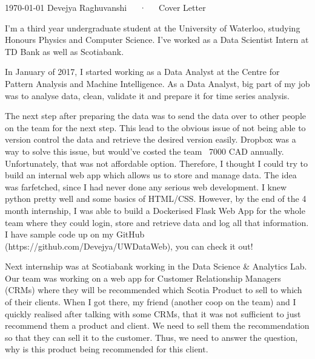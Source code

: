 \documentclass[11pt, a4paper]{awesome-cv}
\begin{document}
\makecvheader[R]

\makecvfooter
  {\today}
  {Devejya Raghuvanshi~~~·~~~Cover Letter}
  {}

\makelettertitle

\begin{cvletter}

I'm a third year undergraduate student at the University of Waterloo, studying Honours Physics and Computer Science. I've worked as a Data Scientist Intern at TD Bank as well as Scotiabank.

In January of 2017, I started working as a Data Analyst at the Centre for Pattern Analysis and Machine Intelligence. As a Data Analyst, big part of my job was to analyse data, clean, validate it and prepare it for time series analysis.

The next step after preparing the data was to send the data over to other people on the team for the next step. This lead to the obvious issue of not being able to version control the data and retrieve the desired version easily. Dropbox was a way to solve this issue, but would've costed the team ~7000 CAD annually. Unfortunately, that was not affordable option. Therefore, I thought I could try to build an internal web app which allows us to store and manage data. The idea was farfetched, since I had never done any serious web development. I knew python pretty well and some basics of HTML/CSS. However, by the end of the 4 month internship, I was able to build a Dockerised Flask Web App for the whole team where they could login, store and retrieve data and log all that information. I have sample code up on my GitHub (https://github.com/Devejya/UWDataWeb), you can check it out! 

Next internship was at Scotiabank working in the Data Science & Analytics Lab. Our team was working on a web app for Customer Relationship Managers (CRMs) where they will be recommended which Scotia Product to sell to which of their clients. When I got there, my friend (another coop on the team) and I quickly realised after talking with some CRMs, that it was not sufficient to just recommend them a product and client. We need to sell them the recommendation so that they can sell it to the customer. Thus, we need to answer the question, why is this product being recommended for this client.


\end{cvletter}
\end{document}
